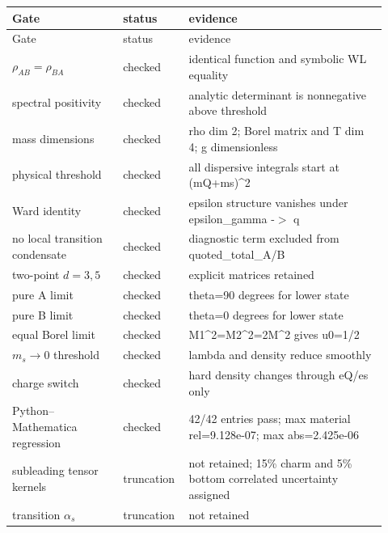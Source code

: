 \begin{longtable}{p{0.29\linewidth}p{0.13\linewidth}p{0.50\linewidth}}
\toprule
Gate & status & evidence\\
\midrule
\endfirsthead
\toprule
Gate & status & evidence\\
\midrule
\endhead
$\rho_{AB}=\rho_{BA}$ & checked & identical function and symbolic WL equality\\
spectral positivity & checked & analytic determinant is nonnegative above threshold\\
mass dimensions & checked & rho dim 2; Borel matrix and T dim 4; g dimensionless\\
physical threshold & checked & all dispersive integrals start at (mQ+ms)\textasciicircum{}2\\
Ward identity & checked & epsilon structure vanishes under epsilon\_gamma -$>$ q\\
no local transition condensate & checked & diagnostic term excluded from quoted\_total\_A/B\\
two-point $d=3,5$ & checked & explicit matrices retained\\
pure A limit & checked & theta=90 degrees for lower state\\
pure B limit & checked & theta=0 degrees for lower state\\
equal Borel limit & checked & M1\textasciicircum{}2=M2\textasciicircum{}2=2M\textasciicircum{}2 gives u0=1/2\\
$m_s\to0$ threshold & checked & lambda and density reduce smoothly\\
charge switch & checked & hard density changes through eQ/es only\\
Python--Mathematica regression & checked & 42/42 entries pass; max material rel=9.128e-07; max abs=2.425e-06\\
subleading tensor kernels & truncation & not retained; 15\% charm and 5\% bottom correlated uncertainty assigned\\
transition $\alpha_s$ & truncation & not retained\\
\bottomrule
\end{longtable}

